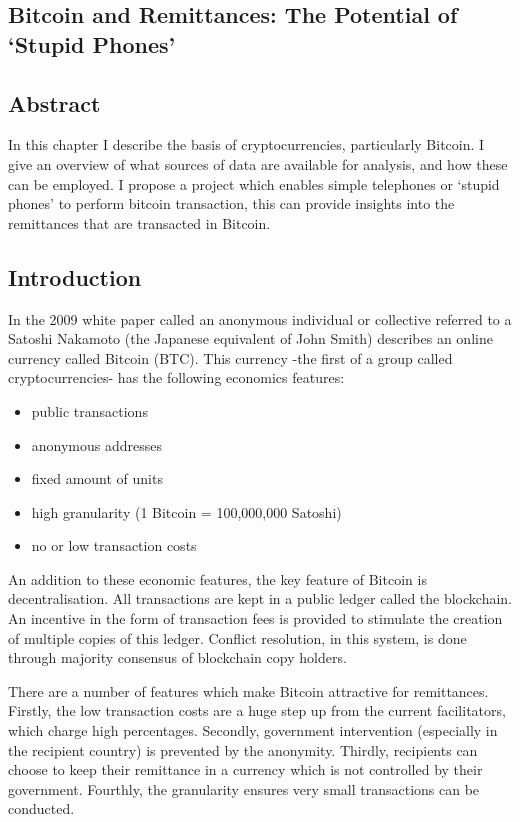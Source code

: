 \begin{refsection}
\chapter{Bitcoin and Remittances: The Potential of `Stupid Phones'}
\label{bitremit}
\section*{Abstract}
In this chapter I describe the basis of cryptocurrencies, particularly Bitcoin.
I give an overview of what sources of data are available for analysis, and how these can be employed.
I propose a project which enables simple telephones or `stupid phones' to perform bitcoin transaction,
this can provide insights into the remittances that are transacted in Bitcoin.
\pagebreak

\section{Introduction}
In the 2009 white paper \parencite{nakamoto2008bitcoin} called  an anonymous individual or collective referred to a Satoshi Nakamoto (the Japanese equivalent of John Smith) describes an online currency called Bitcoin (BTC). 
This currency -the first of a group called cryptocurrencies- has the following economics features:

\begin{itemize}
\item public transactions
\item anonymous addresses
\item fixed amount of units
\item high granularity (1 Bitcoin = 100,000,000 Satoshi)
\item no or low transaction costs
\end{itemize}

An addition to these economic features, the key feature of Bitcoin is decentralisation.
All transactions are kept in a public ledger called the blockchain. An incentive in the form of transaction fees is provided to stimulate the creation of multiple copies of this ledger.
Conflict resolution, in this system, is done through majority consensus of blockchain copy holders.

There are a number of features which make Bitcoin attractive for remittances. Firstly, the low transaction costs are a huge step up from the current facilitators, which charge high percentages. Secondly, government intervention (especially in the recipient country) is prevented by the anonymity. Thirdly, recipients can choose to keep their remittance in a currency which is not controlled by their government. Fourthly, the granularity ensures very small transactions can be conducted.


\end{refsection}
